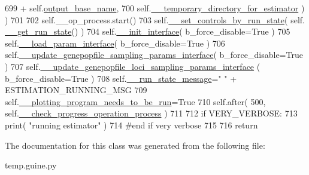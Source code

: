 \begin{DoxyCode}
699                                     + self.\hyperlink{classnegui_1_1temp_1_1PGGuiNeEstimator_ae81206ca875278e3350b118310eb85f2}{output\_base\_name},
700                             self.\hyperlink{classnegui_1_1temp_1_1PGGuiNeEstimator_aba47f0ef5cbb9d974844a8f8a85848ed}{\_\_temporary\_directory\_for\_estimator} ) )
701 
702         self.\_\_op\_process.start()
703         self.\hyperlink{classnegui_1_1temp_1_1PGGuiNeEstimator_a566035a7a99d6cfc22759fa764e0d072}{\_\_set\_controls\_by\_run\_state}( self.
      \hyperlink{classnegui_1_1temp_1_1PGGuiNeEstimator_a274579275f6628b01bf4f9fad852ef01}{\_\_get\_run\_state}() )
704         self.\hyperlink{classnegui_1_1temp_1_1PGGuiNeEstimator_a20a250d5a9897938c1d2b28b6e261273}{\_\_init\_interface}( b\_force\_disable=\textcolor{keyword}{True} )
705         self.\hyperlink{classnegui_1_1temp_1_1PGGuiNeEstimator_aa2f70998cca9527b2dfd178d6a55dce7}{\_\_load\_param\_interface}( b\_force\_disable=\textcolor{keyword}{True} )
706         self.\hyperlink{classnegui_1_1temp_1_1PGGuiNeEstimator_a37fd050843259e8a0a6e2996292c42c7}{\_\_update\_genepopfile\_sampling\_params\_interface}( 
      b\_force\_disable=\textcolor{keyword}{True} )
707         self.\hyperlink{classnegui_1_1temp_1_1PGGuiNeEstimator_a9ea70a6bcd83660afcbc6eae87685024}{\_\_update\_genepopfile\_loci\_sampling\_params\_interface}
      ( b\_force\_disable=\textcolor{keyword}{True} )
708         self.\hyperlink{classnegui_1_1temp_1_1PGGuiNeEstimator_aed76b9deeff98c844eefe49b238f4ab9}{\_\_run\_state\_message}=\textcolor{stringliteral}{"  "} + ESTIMATION\_RUNNING\_MSG
709         self.\hyperlink{classnegui_1_1temp_1_1PGGuiNeEstimator_a8449ebdfc13612d25d46d40c89801985}{\_\_plotting\_program\_needs\_to\_be\_run}=\textcolor{keyword}{True} 
710         self.after( 500, self.\hyperlink{classnegui_1_1temp_1_1PGGuiNeEstimator_a26ee2fcfdf1779d21c01caff89700d68}{\_\_check\_progress\_operation\_process} )
711 
712         \textcolor{keywordflow}{if} VERY\_VERBOSE:
713             print( \textcolor{stringliteral}{"running estimator"} )
714         \textcolor{comment}{#end if very verbose}
715 
716         \textcolor{keywordflow}{return}
\end{DoxyCode}


The documentation for this class was generated from the following file\+:\begin{DoxyCompactItemize}
\item 
temp.\+guine.\+py\end{DoxyCompactItemize}
